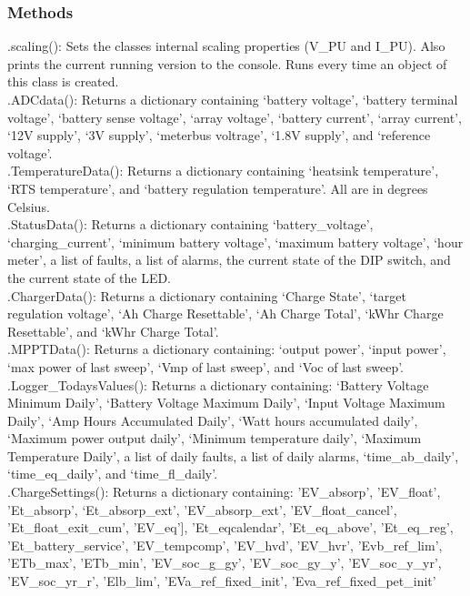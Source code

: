 \subsubsection{Methods}

.scaling(): Sets the classes internal scaling properties (V\_PU and I\_PU). Also prints the current running version to the console. Runs every time an object of this class is created. \\

.ADCdata(): Returns a dictionary containing ‘battery voltage’, ‘battery terminal voltage’, ‘battery sense voltage’, ‘array voltage’, ‘battery current’, ‘array current’, ‘12V supply’, ‘3V supply’, ‘meterbus voltrage’, ‘1.8V supply’, and ‘reference voltage’. \\

.TemperatureData(): Returns a dictionary containing ‘heatsink temperature’, ‘RTS temperature’, and ‘battery regulation temperature’. All are in degrees Celsius. \\

.StatusData(): Returns a dictionary containing ‘battery\_voltage’, ‘charging\_current’, ‘minimum battery voltage’, ‘maximum battery voltage’, ‘hour meter’, a list of faults, a list of alarms, the current state of the DIP switch, and the current state of the LED. \\

.ChargerData(): Returns a dictionary containing ‘Charge State’, ‘target regulation voltage’, ‘Ah Charge Resettable’, ‘Ah Charge Total’, ‘kWhr Charge Resettable’, and ‘kWhr Charge Total’. \\

.MPPTData(): Returns a dictionary containing: ‘output power’, ‘input power’, ‘max power of last sweep’, ‘Vmp of last sweep’, and ‘Voc of last sweep’. \\

.Logger\_TodaysValues(): Returns a dictionary containing: ‘Battery Voltage Minimum Daily’, ‘Battery Voltage Maximum Daily’, ‘Input Voltage Maximum Daily’, ‘Amp Hours Accumulated Daily’, ‘Watt hours accumulated daily’, ‘Maximum power output daily’, ‘Minimum temperature daily’, ‘Maximum Temperature Daily’, a list of daily faults, a list of daily alarms, ‘time\_ab\_daily’, ‘time\_eq\_daily’, and ‘time\_fl\_daily’. \\

.ChargeSettings(): Returns a dictionary containing: 'EV\_absorp', 'EV\_float', 'Et\_absorp', ‘Et\_absorp\_ext', 'EV\_absorp\_ext', 'EV\_float\_cancel', 'Et\_float\_exit\_cum', 'EV\_eq'], 'Et\_eqcalendar', 'Et\_eq\_above', 'Et\_eq\_reg', 'Et\_battery\_service', 'EV\_tempcomp', 'EV\_hvd', 'EV\_hvr', 'Evb\_ref\_lim', 'ETb\_max', 'ETb\_min', 'EV\_soc\_g\_gy', 'EV\_soc\_gy\_y', 'EV\_soc\_y\_yr', 'EV\_soc\_yr\_r', 'Elb\_lim', 'EVa\_ref\_fixed\_init', 'Eva\_ref\_fixed\_pet\_init' \\


